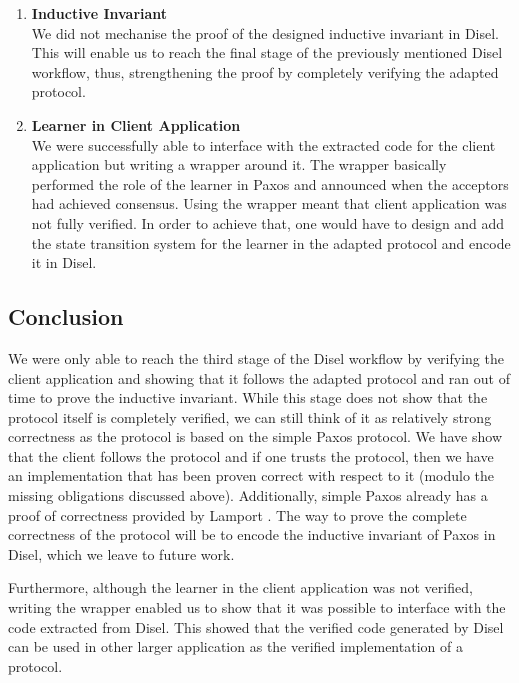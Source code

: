 \begin{enumerate}
  \item \textbf{Inductive Invariant} \\
    We did not mechanise the proof of the designed inductive invariant in Disel.
    This will enable us to reach the final stage of the previously mentioned Disel workflow,
    thus, strengthening the proof by completely verifying the adapted protocol.
  \item \textbf{Learner in Client Application} \\
    We were successfully able to interface with the extracted code for the client
    application but writing a wrapper around it. The wrapper basically performed
    the role of the learner in Paxos and announced when the acceptors had
    achieved consensus. Using the wrapper meant that client application was not
    fully verified. In order to achieve that, one would have to design and add the
    state transition system for the learner in the adapted protocol and encode it
    in Disel.
\end{enumerate}

\vspace{-5mm}
\subsection{Conclusion}
We were only able to reach the third stage of the Disel workflow by
verifying the client application and showing that it follows the
adapted protocol and ran out of time to prove the inductive invariant.
While this stage does not show that the protocol itself
is completely verified, we can still think of it as relatively strong
correctness as the protocol is based on the simple Paxos protocol.
We have show that the client follows the protocol and
if one trusts the protocol, then we have an implementation that has been proven correct
with respect to it (modulo the missing obligations discussed above).
Additionally, simple Paxos already has a proof of correctness provided by Lamport \cite{4}.
The way to prove the complete correctness of the protocol will be to encode the
inductive invariant of Paxos in Disel, which we leave to future work.

Furthermore, although the learner in the client application was not verified,
writing the wrapper enabled us to show that it was possible to interface with
the code extracted from Disel. This showed that the verified code generated by
Disel can be used in other larger application as the verified implementation of
a protocol.

